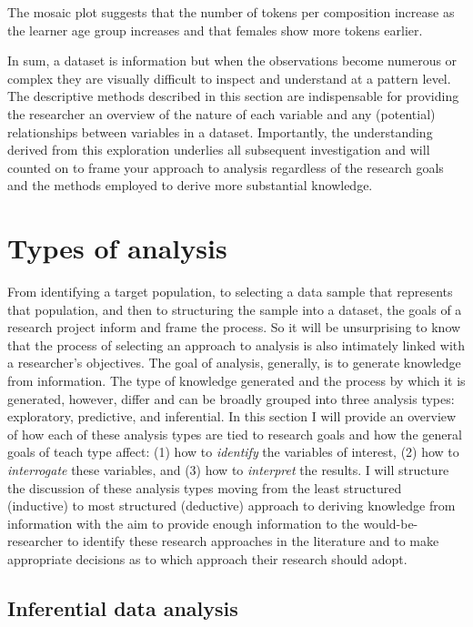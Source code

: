 \documentclass[
  letterpaper,
]{latex/krantz}
\begin{document}
The mosaic plot suggests that the number of tokens per composition
increase as the learner age group increases and that females show more
tokens earlier.

In sum, a dataset is information but when the observations become
numerous or complex they are visually difficult to inspect and
understand at a pattern level. The descriptive methods described in this
section are indispensable for providing the researcher an overview of
the nature of each variable and any (potential) relationships between
variables in a dataset. Importantly, the understanding derived from this
exploration underlies all subsequent investigation and will counted on
to frame your approach to analysis regardless of the research goals and
the methods employed to derive more substantial knowledge.

\hypertarget{aa-types-of-analysis}{%
\section{Types of analysis}\label{aa-types-of-analysis}}

From identifying a target population, to selecting a data sample that
represents that population, and then to structuring the sample into a
dataset, the goals of a research project inform and frame the process.
So it will be unsurprising to know that the process of selecting an
approach to analysis is also intimately linked with a researcher's
objectives. The goal of analysis, generally, is to generate knowledge
from information. The type of knowledge generated and the process by
which it is generated, however, differ and can be broadly grouped into
three analysis types: exploratory, predictive, and inferential. In this
section I will provide an overview of how each of these analysis types
are tied to research goals and how the general goals of teach type
affect: (1) how to \emph{identify} the variables of interest, (2) how to
\emph{interrogate} these variables, and (3) how to \emph{interpret} the
results. I will structure the discussion of these analysis types moving
from the least structured (inductive) to most structured (deductive)
approach to deriving knowledge from information with the aim to provide
enough information to the would-be-researcher to identify these research
approaches in the literature and to make appropriate decisions as to
which approach their research should adopt.

\hypertarget{aa-types-of-analysis-inferential}{%
\subsection{Inferential data
analysis}\label{aa-types-of-analysis-inferential}}
\end{document}
